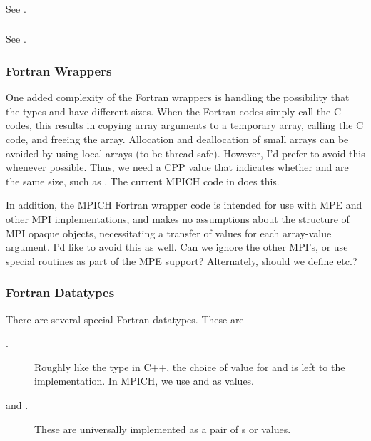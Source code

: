 \documentclass{article}
\begin{document}
\subsubsection{}
See .

\subsubsection{}
See .

\subsubsection{Fortran Wrappers}
One added complexity of the Fortran wrappers is handling the possibility that
the types  and  have different sizes.  When the
Fortran codes simply call the C codes, this results in copying array arguments
to a temporary array, calling the C code, and freeing the array.  Allocation
and deallocation of small arrays can be avoided by using local arrays (to be
thread-safe).  However, I'd prefer to avoid this whenever possible.  Thus, we
need a CPP value that indicates whether  and  are the
same size, such as .  The current MPICH code in
 does this.

In addition, the MPICH Fortran wrapper code is intended for use with MPE and
other MPI implementations, and makes no assumptions about the structure of
MPI opaque objects, necessitating a transfer of values for each array-value
argument.  I'd like to avoid this as well.  Can we ignore the other MPI's, or
use special routines as part of the MPE support?  Alternately, should we
define  etc.?

\subsubsection{Fortran Datatypes}
There are several special Fortran datatypes.  These are
\begin{description}
\item[.]Roughly like the  type in C++, the choice of
  value for  and  is left to the implementation.
  In MPICH, we use  and  as values.
\item[ and .]These are universally implemented
  as a pair of s or  values.
\end{description}
\end{document}
